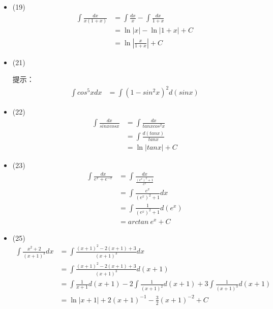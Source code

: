 \documentclass{article}
\begin{document}
\begin{itemize}
  \item (19)
        \begin{align*}
          \int \frac{dx}{x(1 + x)}
           & = \int \frac{dx}{x} - \int \frac{dx}{1 + x} \\
           & = \ln |x| - \ln |1 + x| + C                 \\
           & = \ln \left|\frac{x}{1 + x}\right| + C
        \end{align*}
  \item (21)

        提示：
        \begin{align*}
          \int cos^5x dx
           & = \int (1 - sin^2x)^2 d(sinx)
        \end{align*}

  \item (22)
        \begin{align*}
          \int \frac{dx}{sinx cos x}
           & = \int \frac{dx}{tanx cos^2x} \\
           & = \int \frac{d(tanx)}{tanx}   \\
           & = \ln |tanx| + C
        \end{align*}

  \item (23)
        \begin{align*}
          \int \frac{dx}{e^x + e^{-x}}
           & = \int \frac{dx}{\frac{(e^x)^2 + 1}{e^x}} \\
           & = \int \frac{e^x}{(e^x)^2 + 1} dx         \\
           & = \int \frac{1}{(e^x)^2 + 1} d(e^x)       \\
           & = arc tan \ e^x + C
        \end{align*}
  \item (25)
        \begin{align*}
          \int \frac{x^2 + 2}{(x+1)^3} dx
           & = \int \frac{(x + 1)^2 - 2(x + 1) + 3}{(x+1)^3} dx                                                    \\
           & = \int \frac{(x + 1)^2 - 2(x + 1) + 3}{(x+1)^3} d(x + 1)                                              \\
           & = \int \frac{1}{x+1} d(x + 1) - 2 \int \frac{1}{(x+1)^2} d(x + 1) + 3 \int \frac{1}{(x+1)^3} d(x + 1) \\
           & = \ln |x + 1| + 2 (x + 1)^{-1} - \frac{3}{2} (x + 1)^{-2} + C
        \end{align*}


\end{itemize}
\end{document}
